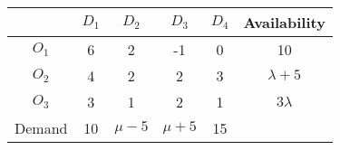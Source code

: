 \begin{tabular}{|c|c|c|c|c|c|}
\hline 
 & $D_1$ & $D_2$ & $D_3$ & $D_4$ & Availability\\
\hline
$O_1$ & 6 & 2 & -1 & 0 & 10 \\
\hline 
$O_2$ & 4 & 2 & 2 & 3 & $\lambda + 5$\\
\hline 
$O_3$ & 3 & 1 & 2 & 1 & $3\lambda$\\
\hline 
Demand & 10 & $\mu - 5$ & $\mu + 5$ & 15 & \\
\hline
\end{tabular}
